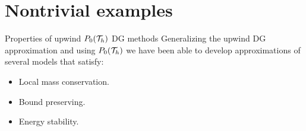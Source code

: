 	\section{Nontrivial examples}
		\begin{frame}{Properties of upwind $\relax{P}_0(\mathcal{T}_h)$ DG methods}
		Generalizing the upwind DG approximation and using $\relax{P}_0(\mathcal{T}_h)$ we have been able to develop approximations of several models that satisfy: 
		\vspace*{0.5cm}
			\begin{itemize}\itemsep1em
				\item Local mass conservation.
				\item Bound preserving.
				\item Energy stability.
			\end{itemize}
		\end{frame}

